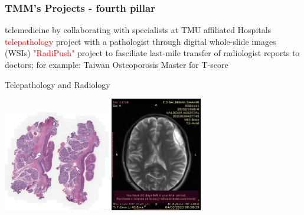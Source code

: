 \documentclass[aspectratio=169]{beamer}
\begin{document}
\begin{frame}
\frametitle{TMM's Projects - fourth pillar}
\begin{outline}    
    \1 telemedicine
        \2 by collaborating with specialists at TMU affiliated Hospitals
        \2 \textcolor{red}{telepathology} project with a pathologist through digital whole-slide images (WSIs)
        \2 \textcolor{red}{"RadiPush"} project to fasciliate last-mile transfer of radiologist reports to doctors; for example: Taiwan Osteoporosis Master for T-score
    
\end{outline}
\end{frame}


\begin{frame}{Telepathology and Radiology}
    \begin{center}
        \includegraphics[width=0.35\textwidth]{TH1919729C1_HE.jpeg}
        \includegraphics[width=0.30\textwidth]{IMG-0007-00001.jpg}
    \end{center}
\end{frame}
\end{document}
